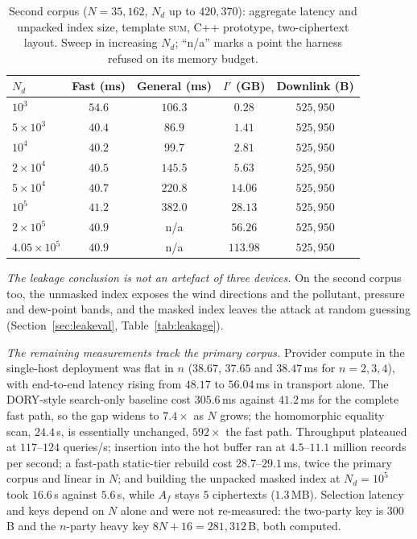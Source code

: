 \documentclass[a4paper,fleqn]{cas-sc}
\begin{document}
\begin{table}[pos=htbp]
\caption{Second corpus ($N=35{,}162$, $N_d$ up to $420{,}370$): aggregate
latency and unpacked index size, template \textsc{sum}, C++ prototype,
two-ciphertext layout. Sweep in increasing $N_d$; ``n/a'' marks a point the
harness refused on its memory budget.}
\label{tab:beijing}
\centering
\footnotesize
\setlength{\tabcolsep}{3pt}
\begin{tabular*}{\tblwidth}{@{\extracolsep{\fill}}lcccc@{}}
\toprule
$N_d$ & Fast (ms) & General (ms) & $I'$ (GB) & Downlink (B) \\
\midrule
$10^3$             & $54.6$ & $106.3$ & $0.28$   & $525{,}950$ \\
$5\times10^3$      & $40.4$ & $86.9$  & $1.41$   & $525{,}950$ \\
$10^4$             & $40.2$ & $99.7$  & $2.81$   & $525{,}950$ \\
$2\times10^4$      & $40.5$ & $145.5$ & $5.63$   & $525{,}950$ \\
$5\times10^4$      & $40.7$ & $220.8$ & $14.06$  & $525{,}950$ \\
$10^5$             & $41.2$ & $382.0$ & $28.13$  & $525{,}950$ \\
$2\times10^5$      & $40.9$ & n/a     & $56.26$  & $525{,}950$ \\
$4.05\times10^5$   & $40.9$ & n/a     & $113.98$ & $525{,}950$ \\
\bottomrule
\end{tabular*}
\end{table}

\emph{The leakage conclusion is not an artefact of three devices.} On the
second corpus too, the unmasked index exposes the wind directions and the
pollutant, pressure and dew-point bands, and the masked index leaves the attack
at random guessing (Section~\ref{sec:leakeval}, Table~\ref{tab:leakage}).

\emph{The remaining measurements track the primary corpus.} Provider compute
in the single-host deployment was flat in $n$ ($38.67$, $37.65$ and
$38.47$\,ms for $n=2,3,4$), with end-to-end latency rising from $48.17$ to
$56.04$\,ms in transport alone. The DORY-style search-only baseline cost
$305.6$\,ms against $41.2$\,ms for the complete fast path, so the gap widens to
$7.4\times$ as $N$ grows; the homomorphic equality scan, $24.4$\,s, is
essentially unchanged, $592\times$ the fast path. Throughput plateaued at
$117$--$124$ queries/s; insertion into the hot buffer ran at $4.5$--$11.1$
million records per second; a fast-path static-tier rebuild cost
$28.7$--$29.1$\,ms, twice the primary corpus and linear in $N$; and building
the unpacked masked index at $N_d=10^5$ took $16.6$\,s against $5.6$\,s, while
$A_f$ stays $5$ ciphertexts ($1.3$\,MB). Selection latency and keys depend on
$N$ alone and were not re-measured: the two-party key is $300$\,B and the
$n$-party heavy key $8N+16=281{,}312$\,B, both computed.
\end{document}

